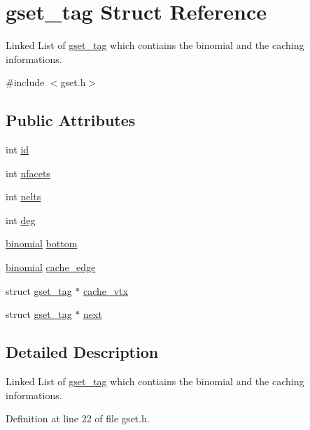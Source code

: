 \hypertarget{structgset__tag}{\section{gset\-\_\-tag Struct Reference}
\label{structgset__tag}
}


Linked List of \hyperlink{structgset__tag}{gset\-\_\-tag} which contiains the binomial and the caching informations.  




{\ttfamily \#include $<$gset.\-h$>$}

\subsection*{Public Attributes}
\begin{DoxyCompactItemize}
\item 
int \hyperlink{structgset__tag_ac376d7702448d0c772d8a6bafba1b049}{id}
\item 
int \hyperlink{structgset__tag_ae35229febf28ec3a6918b982dd46bb36}{nfacets}
\item 
int \hyperlink{structgset__tag_aabeeae6b191c2384977c7a43fcecd9ce}{nelts}
\item 
int \hyperlink{structgset__tag_a86def23498b994bdf394e084c75664a7}{deg}
\item 
\hyperlink{binomial_8h_a805580ea35b5ac9d25526fb2d3131738}{binomial} \hyperlink{structgset__tag_a62011a8cfe1a9c32a02e3e64dfafe374}{bottom}
\item 
\hyperlink{binomial_8h_a805580ea35b5ac9d25526fb2d3131738}{binomial} \hyperlink{structgset__tag_aa8a0d5df92489f6e24533d42322fa567}{cache\-\_\-edge}
\item 
struct \hyperlink{structgset__tag}{gset\-\_\-tag} $\ast$ \hyperlink{structgset__tag_a4143c72b749ac8c587479fcc9a564583}{cache\-\_\-vtx}
\item 
struct \hyperlink{structgset__tag}{gset\-\_\-tag} $\ast$ \hyperlink{structgset__tag_a221375aaa3d35df3270c7e551ded215b}{next}
\end{DoxyCompactItemize}


\subsection{Detailed Description}
Linked List of \hyperlink{structgset__tag}{gset\-\_\-tag} which contiains the binomial and the caching informations. 

Definition at line 22 of file gset.\-h.



